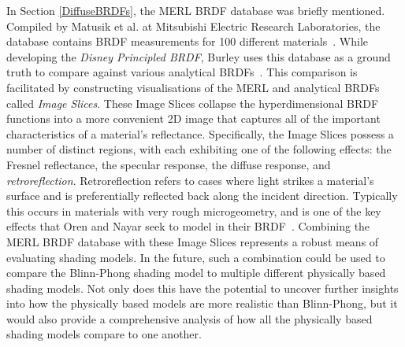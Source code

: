 In Section \ref{DiffuseBRDFs}, the MERL BRDF database was briefly mentioned. Compiled by Matusik et al. at Mitsubishi Electric Research Laboratories, the database contains BRDF measurements for 100 different materials~\cite{MERL}. While developing the \textit{Disney Principled BRDF}, Burley uses this database as a ground truth to compare against various analytical BRDFs~\cite{Burley2012Physically}. This comparison is facilitated by constructing visualisations of the MERL and analytical BRDFs called \textit{Image Slices}. These Image Slices collapse the hyperdimensional BRDF functions into a more convenient 2D image that captures all of the important characteristics of a material's reflectance. Specifically, the Image Slices possess a number of distinct regions, with each exhibiting one of the following effects: the Fresnel reflectance, the specular response, the diffuse response, and \textit{retroreflection}. Retroreflection refers to cases where light strikes a material's surface and is preferentially reflected back along the incident direction. Typically this occurs in materials with very rough microgeometry, and is one of the key effects that Oren and Nayar seek to model in their BRDF~\cite{OrenAndNayar}. Combining the MERL BRDF database with these Image Slices represents a robust means of evaluating shading models. In the future, such a combination could be used to compare the Blinn-Phong shading model to multiple different physically based shading models. Not only does this have the potential to uncover further insights into how the physically based models are more realistic than Blinn-Phong, but it would also provide a comprehensive analysis of how all the physically based shading models compare to one another.

